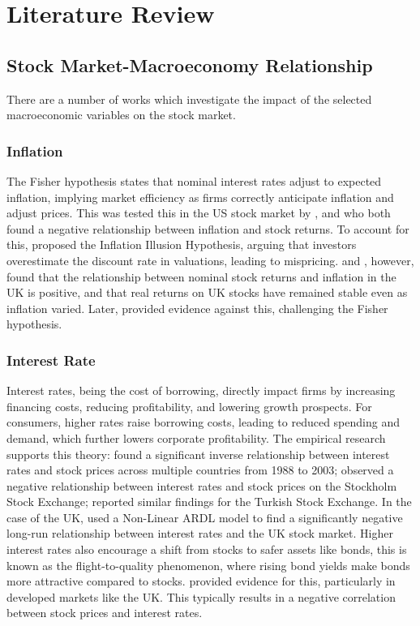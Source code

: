 \documentclass[11pt,a4paper]{article}
\newcommand{\citeboth}[1]{\citeauthor{#1} \citep{#1}}
\begin{document}
\section{Literature Review}

\subsection{Stock Market-Macroeconomy Relationship}

There are a number of works which investigate the impact of 
the selected macroeconomic variables
on the stock market.

\subsubsection{Inflation}

The Fisher hypothesis states that nominal interest rates adjust to expected 
inflation, implying market efficiency as firms correctly anticipate inflation 
and adjust prices. This was tested this in the US stock market by \citeboth{jaffe1976}, and
\citeboth{bodie1976} who both found a negative relationship between inflation and stock returns.
To account for this,
\citeboth{mogdiliani1979} proposed the Inflation Illusion Hypothesis, 
arguing that investors overestimate the discount rate in valuations, leading to mispricing. 
\citeboth{gultekin1983} and \citeboth{firth1979}, however, found that the relationship between nominal stock returns and inflation in the UK is positive, and that real returns on UK stocks have remained stable even as inflation varied.
Later, \citeboth{hasan2008} provided evidence against this, challenging the Fisher hypothesis.

\subsubsection{Interest Rate}

Interest rates, being the cost of borrowing, directly impact firms by increasing financing costs, reducing profitability, and lowering growth prospects. For consumers, higher rates raise borrowing costs, leading to reduced spending and demand, which further lowers corporate profitability. 
The empirical research supports this theory: \citeboth{alam2009} found a significant inverse relationship between interest rates and stock prices across multiple countries from 1988 to 2003; 
\citeboth{talla2013} observed a negative relationship between interest rates and stock prices on the Stockholm Stock Exchange; 
\citeboth{demir2019} reported similar findings for the Turkish Stock Exchange. In the case of the UK, \citeboth{neifar2023} used a Non-Linear ARDL model to find a significantly negative long-run relationship between interest rates and the UK stock market. Higher interest rates also encourage a shift from stocks to safer 
assets like bonds, this is known as the flight-to-quality phenomenon, where rising bond yields make bonds more attractive compared to stocks. \citeboth{asgharian2016} provided evidence for this, particularly in developed markets like the UK. This typically results in a negative correlation between stock prices and interest rates.
\end{document}
